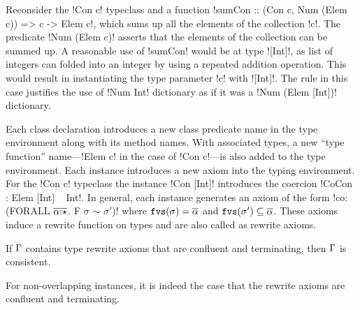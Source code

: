 \documentclass[screen,nonacm]{acmart}
\begin{document}
Reconsider the !Con c! typeclass and a function
!sumCon :: (Con c, Num (Elem c)) => c -> Elem c!, which sums up all
the elements of the collection !c!. The predicate !Num (Elem c)!
asserts that the elements of the collection can be summed up. A
reasonable use of !sumCon! would be at type ![Int]!, as list of
integers can folded into an integer by using a repeated addition
operation. This would result in instantiating the type parameter !c!
with ![Int]!. The rule  in this case justifies the use of
!Num Int! dictionary as if it was a !Num (Elem [Int])! dictionary.


Each class declaration introduces a new class predicate name in the type environment along with its method names. With associated types, a new ``type function'' name---!Elem c! in the case of !Con c!---is also added to the type environment.
Each instance introduces a new axiom into the typing environment. For the !Con c! typeclass the instance !Con [Int]! introduces the coercion !CoCon : Elem [Int] ~ Int!. In general, each instance generates an axiom of the form !co: (FORALL $\overline{\alpha{:}\star}$. F $\sigma$ $\sim$ $\sigma'$)! where $\texttt{fvs}(\sigma) = \overline{\alpha}$
and $\texttt{fvs}(\sigma') \subseteq \overline{\alpha}$. These axioms induce a rewrite function on types and are also called as rewrite axioms.

\begin{theorem}
If $\Gamma$ contains type rewrite axioms that are confluent and terminating, then $\Gamma$ is consistent.
\end{theorem}
For non-overlapping instances, it is indeed the case that the rewrite axioms are confluent and terminating.
\end{document}
